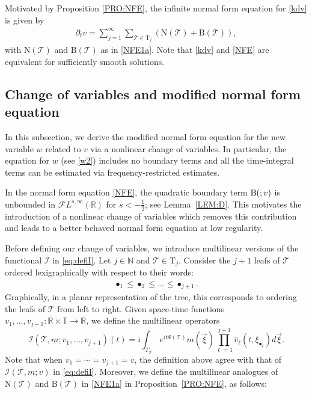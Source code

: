 \documentclass[%
11pt,  reqno]{amsart}
\makeatletter
\newcommand{\5}{\textup{V}}
\newcommand{\FL}{\mathcal{F} L}
\newcommand{\ft}{\widehat}
\newcommand{\dt}{\partial_t}
\theoremstyle{remark}
\newcommand{\R}{\mathbb{R}}
\newcommand{\T}{\mathbb{T}}
\newcommand{\bul}{\bullet}
\newcommand{\TT}{\mathcal{T}}
\newcommand{\Tr}{\mathrm{T}}
\renewcommand{\l}{\ell}
\newcommand{\N}{\mathbb{N}}
\def\<#1>{\csname MH@symb@#1\endcsname}
\newcommand{\B}{\mathcal{B}}
\newcommand{\Ical}{\mathcal{I}}
\numberwithin{equation}{section}
\numberwithin{theorem}{section}
\newcommand{\NN}{\mathrm{N}}
\newcommand{\BB}{\mathrm{B}}
\makeatother
\begin{document}
{Motivated by Proposition \ref{PRO:NFE}, the infinite normal form equation for
\eqref{kdv} is given by
\begin{align}
\label{NFE}
\dt v= \sum_{j=1}^{\infty} \sum_{\TT\in \Tr_j} \left(\NN(\TT) +
\BB(\TT) \right)
,
\end{align}
with $\NN(\TT)$ and $\BB(\TT)$ as in \eqref{NFE1a}.
Note that \eqref{kdv} and \eqref{NFE} are equivalent for sufficiently smooth solutions.



}



\subsection{Change of variables and modified normal form equation}
\label{SUBSEC:gauge}

In this subsection, we derive the modified normal form equation for the new variable $w$ related to $v$ via a nonlinear change of variables. In particular, the equation for $w$ (see \eqref{w2}) includes no boundary terms and all the time-integral terms can be estimated via frequency-restricted estimates.



In the normal form equation \eqref{NFE}, the quadratic boundary term $\BB(\<1>;v)$ is unbounded in $\FL^{s,\infty}(\R)$ for $s<-\frac12$; see Lemma~\ref{LEM:D}. This motivates the introduction of a nonlinear change of variables which removes this contribution and leads to a better behaved normal form equation at low regularity.

Before defining our change of variables, we introduce multilinear versions of the functional $\Ical$ in \eqref{eq:defiI}.
Let $j\in \N$ and $\TT\in \Tr_j$. Consider the $j+1$ leafs of $\TT$ ordered lexigraphically with respect to their words:
\begin{align}
\label{lexic}
\bul_1\le \bul_2\le \dots \le \bul_{j+1}.
\end{align}
Graphically, in a
planar representation of the tree, this corresponds to ordering the leafs of
$\TT$ from left to right. Given space-time functions $v_1,\dots, v_{j+1}: \R \times \T \to \R$, we
define the multilinear operators
\begin{equation}\label{eq:defiImulti}
\Ical(\TT, m; v_1,\dots,v_{j+1}) (t)=i
\int_{\Gamma_\TT}
e^{it\Psi(\TT)}m(\vec{\xi}) \prod_{\ell
=1}^{j+1} \ft v_\l (t,\xi_{\bul_\ell}) d\vec{\xi}
.
\end{equation}
Note that
when $v_1 = \cdots = v_{j+1} = v$, the definition above agree with that of $\Ical(\TT, m; v )$ in \eqref{eq:defiI}.  Moreover, we define the multilinear analogues of $\NN(\TT)$ and $\BB(\TT)$ in \eqref{NFE1a} in Proposition~\ref{PRO:NFE}, as follows:
\end{document}
